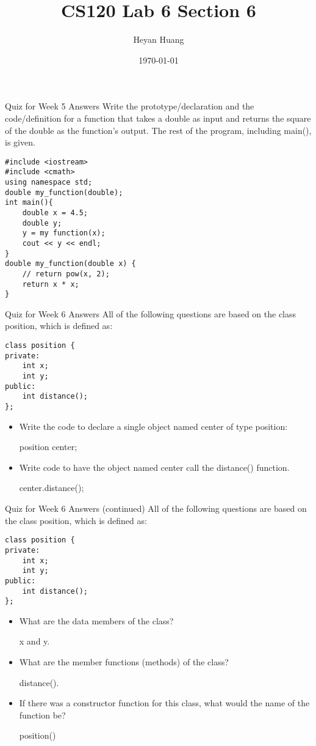 \documentclass[presentation]{beamer}
\author{Heyan Huang}
\date{\today}
\title{CS120 Lab \alert{6} Section \alert{6}}
\begin{document}
\maketitle

\begin{frame}[fragile,label=sec-1]{Quiz for Week 5 \alert{Answers}}
 Write the prototype/declaration and the code/definition for a function that takes a double as input and returns the square of the double as the function's output. The rest of the program, including main(), is given.
\begin{verbatim}
#include <iostream>
#include <cmath>
using namespace std;
double my_function(double);
int main(){
    double x = 4.5;
    double y;
    y = my function(x);
    cout << y << endl;
}
double my_function(double x) {
    // return pow(x, 2);
    return x * x;
}
\end{verbatim}
\end{frame}

\begin{frame}[fragile,label=sec-2]{Quiz for Week 6 \alert{Answers}}
 All of the following questions are based on the class position, which is defined as:
\begin{verbatim}
class position {
private:
    int x;
    int y;
public:
    int distance();
};
\end{verbatim}
\begin{itemize}
\item Write the code to declare a single object named \alert{center} of type position:

\alert{position center;}
\item Write code to have the object named center call the \alert{distance()} function.

\alert{center.distance();}
\end{itemize}
\end{frame}

\begin{frame}[fragile,label=sec-3]{Quiz for Week 6 \alert{Answers} (continued)}
 All of the following questions are based on the class position, which is defined as:
\begin{verbatim}
class position {
private:
    int x;
    int y;
public:
    int distance();
};
\end{verbatim}
\begin{itemize}
\item What are the data members of the class?

\alert{x and y.}
\item What are the member functions (methods) of the class?

\alert{distance().}
\item If there was a constructor function for this class, what would the name of the function be?

\alert{position()}
\end{itemize}
\end{frame}
\end{document}
